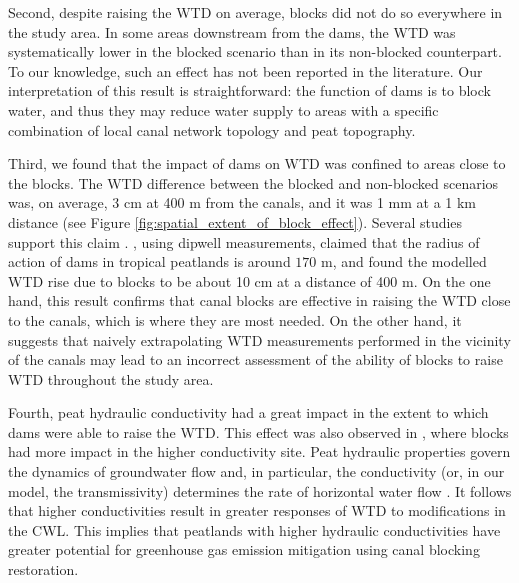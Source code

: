 \documentclass[bg, manuscript]{copernicus}
\begin{document}
Second, despite raising the WTD on average, blocks did not do so everywhere in the study area.
In some areas downstream from the dams, the WTD was systematically lower in the blocked scenario than in its non-blocked counterpart.
To our knowledge, such an effect has not been reported in the literature.
Our interpretation of this result is straightforward: the function of dams is to block water, and thus they may reduce water supply to areas with a specific combination of local canal network topology and peat topography.

Third, we found that the impact of dams on WTD was  confined to areas close to the blocks.
The WTD difference between the blocked and non-blocked scenarios was, on average, 3 \unit{cm} at 400 \unit{m} from the canals, and it was 1 \unit{mm} at a 1 \unit{km} distance (see Figure \ref{fig:spatial_extent_of_block_effect}).
Several studies support this claim \citep{sutiknoEffectivenessCanalBlocking2019, sutiknoWaterManagementHydrological2020, evansRatesSpatialVariability2019, putraEffectsDitchDams2021, putraModellingPerformanceBunds2022, ishiiGroundwaterPeatland2016, jaenickePlanningHydrologicalRestoration2010}.
\cite{sutiknoEffectivenessCanalBlocking2019}, using dipwell measurements, claimed that the radius of action of dams in tropical peatlands is around $170$ \unit{m}, and  \cite{ishiiGroundwaterPeatland2016} found the modelled WTD rise due to blocks to be about 10 \unit{cm} at a distance of 400 \unit{m}.
On the one hand, this result confirms that canal blocks are effective in raising the WTD close to the canals, which is where they are most needed.
On the other hand, it suggests that naively extrapolating WTD measurements performed in the vicinity of the canals may lead to an incorrect assessment of the ability of blocks to raise WTD throughout the study area.

Fourth, peat hydraulic conductivity had a great impact in the extent to which dams were able to raise the WTD.
This effect was also observed in \cite{putraModellingPerformanceBunds2022}, where blocks had more impact in the higher conductivity site.
Peat hydraulic properties govern the dynamics of groundwater flow and, in particular, the conductivity (or, in our model, the transmissivity) determines the rate of horizontal water flow \citep{hillelEnvironmentalSoilPhysics1998, bearModelingGroundwaterFlow2010}.
It follows that higher conductivities result in greater responses of WTD to modifications in the CWL.
This implies that peatlands with higher hydraulic conductivities have greater potential for greenhouse gas emission mitigation using canal blocking restoration.
\end{document}
